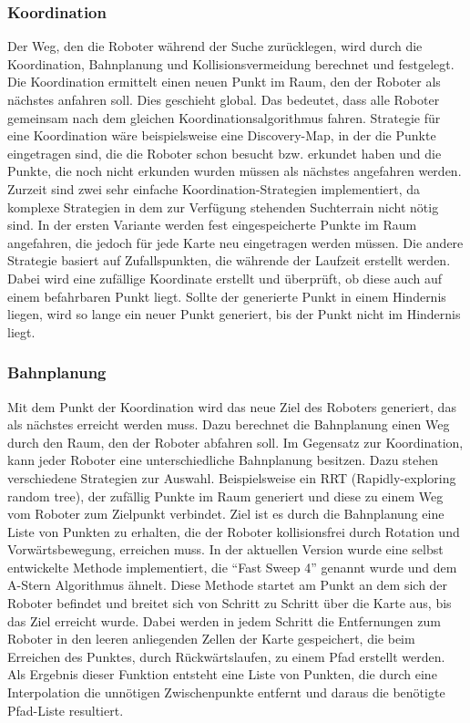 \subsubsection{Koordination}
Der Weg, den die Roboter während der Suche zurücklegen, wird durch die Koordination, Bahnplanung und Kollisionsvermeidung berechnet und festgelegt. Die Koordination ermittelt einen neuen Punkt im Raum, den der Roboter als nächstes anfahren soll. Dies geschieht global. Das bedeutet, dass alle Roboter gemeinsam nach dem gleichen Koordinationsalgorithmus fahren. Strategie für eine Koordination wäre beispielsweise eine Discovery-Map, in der die Punkte eingetragen sind, die die Roboter schon besucht bzw. erkundet haben und die Punkte, die noch nicht erkunden wurden müssen als nächstes angefahren werden. Zurzeit sind zwei sehr einfache Koordination-Strategien implementiert, da komplexe Strategien in dem zur Verfügung stehenden Suchterrain nicht nötig sind. In der ersten Variante werden fest eingespeicherte Punkte im Raum angefahren, die jedoch für jede Karte neu eingetragen werden müssen. Die andere Strategie basiert auf Zufallspunkten, die währende der Laufzeit erstellt werden. Dabei wird eine zufällige Koordinate erstellt und überprüft, ob diese auch auf einem befahrbaren Punkt liegt. Sollte der generierte Punkt in einem Hindernis liegen, wird so lange ein neuer Punkt generiert, bis der Punkt nicht im Hindernis liegt.\\
\subsubsection{Bahnplanung}
Mit dem Punkt der Koordination wird das neue Ziel des Roboters generiert, das als nächstes erreicht werden muss. Dazu berechnet die Bahnplanung einen Weg durch den Raum, den der Roboter abfahren soll. Im Gegensatz zur Koordination, kann jeder Roboter eine unterschiedliche Bahnplanung besitzen. Dazu stehen verschiedene Strategien zur Auswahl. Beispielsweise ein RRT (Rapidly-exploring random tree), der zufällig Punkte im Raum generiert und diese zu einem Weg vom Roboter zum Zielpunkt verbindet. Ziel ist es durch die Bahnplanung eine Liste von Punkten zu erhalten, die der Roboter kollisionsfrei durch Rotation und Vorwärtsbewegung, erreichen muss. In der aktuellen Version wurde eine selbst entwickelte Methode implementiert, die "`Fast Sweep 4"' genannt wurde und dem 
A-Stern Algorithmus ähnelt. Diese Methode startet am Punkt an dem sich der Roboter befindet und breitet sich von Schritt zu Schritt über die Karte aus, bis das Ziel erreicht wurde. Dabei werden in jedem Schritt die Entfernungen zum Roboter in den leeren anliegenden Zellen der Karte gespeichert, die beim Erreichen des Punktes, durch Rückwärtslaufen, zu einem Pfad erstellt werden. Als Ergebnis dieser Funktion entsteht eine Liste von Punkten, die durch eine Interpolation die unnötigen Zwischenpunkte entfernt und daraus die benötigte Pfad-Liste resultiert.\\
